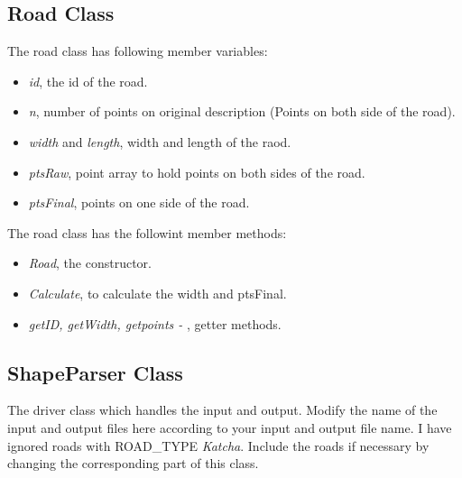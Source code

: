 \documentclass[12pt]{article}
\begin{document}
\subsection*{Road Class}
The road class has following member variables:
\begin{itemize}
\item \textit{id}, the id of the road.
\item \textit{n}, number of points on original description (Points on both side of the road).
\item \textit{width} and \textit{length}, width and length of the raod.
\item \textit{ptsRaw}, point array to hold points on both sides of the road.
\item \textit{ptsFinal}, points on one side of the road.\\
\end{itemize}

The road class has the followint member methods:
\begin{itemize}
\item \textit{Road}, the constructor.
\item \textit{Calculate}, to calculate the width and ptsFinal.
\item \textit{getID, getWidth, getpoints - }, getter methods.
\end{itemize}

\subsection*{ShapeParser Class}
The driver class which handles the input and output. Modify the name of the input and output files here according to your input and output file name. I have ignored roads with ROAD\_TYPE \textit{Katcha}. Include the roads if necessary by changing the corresponding part of this class. 
\end{document}
